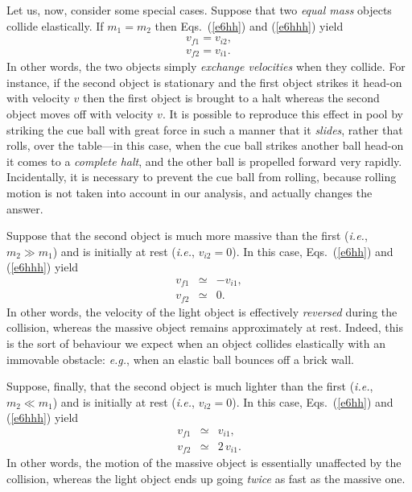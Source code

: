 Let us, now, consider some special cases. Suppose that two {\em equal mass} objects collide elastically.
If $m_1=m_2$ then Eqs.~(\ref{e6hh}) and (\ref{e6hhh}) yield
\begin{eqnarray}
v_{f1} = v_{i2},\\[0.5ex]
v_{f2} = v_{i1}.
\end{eqnarray}
In other words, the two objects simply {\em exchange velocities} when they collide. 
For instance, if the second object is stationary and the first object strikes it head-on
with velocity $v$ then the first object is brought to a halt whereas the second object
moves off with velocity $v$. It is possible to reproduce this effect in pool
by striking the cue ball with great force in such a manner that it {\em slides}, rather
that rolls, over the table---in this case, when the cue ball strikes another ball head-on
it comes to a {\em complete halt}, and the other ball is propelled forward very rapidly.
Incidentally, it is necessary to prevent the cue ball from rolling, because rolling motion
is not taken into account in our analysis, and actually changes the answer.

Suppose that the second object is much more massive than the first ({\em i.e.}, $m_2\gg m_1$)
and is initially at rest ({\em i.e.}, $v_{i2} =0$). In this case, Eqs.~(\ref{e6hh}) and (\ref{e6hhh}) yield
\begin{eqnarray}
v_{f1} &\simeq & - v_{i1},\\[0.5ex]
v_{f2} &\simeq & 0.
\end{eqnarray}
In other words, the velocity of the light object is effectively {\em reversed} during the collision, whereas
the massive object remains approximately at rest. Indeed, this is the sort of behaviour we
expect when an object collides elastically with an immovable obstacle: {\em e.g.}, when an
elastic ball bounces off a brick wall.

Suppose, finally, that the second object is much lighter than the first ({\em i.e.}, $m_2\ll m_1$)
and is initially at rest ({\em i.e.}, $v_{i2} =0$). In this case, Eqs.~(\ref{e6hh}) and (\ref{e6hhh}) yield
\begin{eqnarray}
v_{f1} &\simeq &  v_{i1},\\[0.5ex]
v_{f2} &\simeq & 2\,v_{i1}.
\end{eqnarray}
In other words, the motion of the massive object is essentially unaffected by the collision,
whereas the light object ends up going {\em twice} as fast as the massive one.

